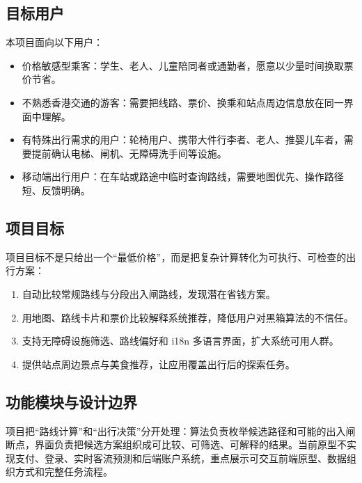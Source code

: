 \documentclass[UTF8,a4paper,11pt]{ctexart}
\begin{document}
\subsection{目标用户}

本项目面向以下用户：
\begin{itemize}
  \item 价格敏感型乘客：学生、老人、儿童陪同者或通勤者，愿意以少量时间换取票价节省。
  \item 不熟悉香港交通的游客：需要把线路、票价、换乘和站点周边信息放在同一界面中理解。
  \item 有特殊出行需求的用户：轮椅用户、携带大件行李者、老人、推婴儿车者，需要提前确认电梯、闸机、无障碍洗手间等设施。
  \item 移动端出行用户：在车站或路途中临时查询路线，需要地图优先、操作路径短、反馈明确。
\end{itemize}

\subsection{项目目标}

项目目标不是只给出一个“最低价格”，而是把复杂计算转化为可执行、可检查的出行方案：
\begin{enumerate}
  \item 自动比较常规路线与分段出入闸路线，发现潜在省钱方案。
  \item 用地图、路线卡片和票价比较解释系统推荐，降低用户对黑箱算法的不信任。
  \item 支持无障碍设施筛选、路线偏好和 i18n 多语言界面，扩大系统可用人群。
  \item 提供站点周边景点与美食推荐，让应用覆盖出行后的探索任务。
\end{enumerate}

\subsection{功能模块与设计边界}

项目把“路线计算”和“出行决策”分开处理：算法负责枚举候选路径和可能的出入闸断点，界面负责把候选方案组织成可比较、可筛选、可解释的结果。当前原型不实现支付、登录、实时客流预测和后端账户系统，重点展示可交互前端原型、数据组织方式和完整任务流程。
\end{document}
